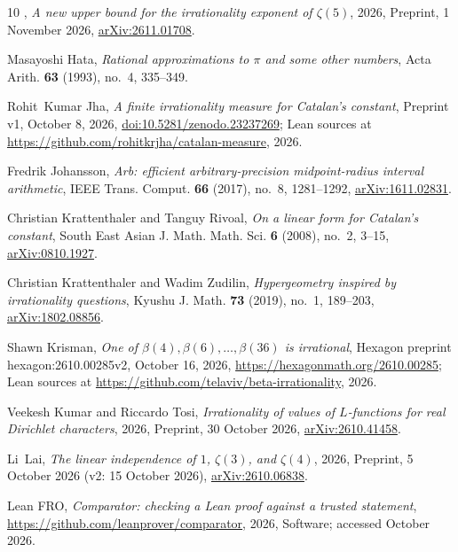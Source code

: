 \documentclass[11pt]{amsart}
\theoremstyle{definition}
\theoremstyle{remark}
\numberwithin{equation}{section}
\begin{document}
\begin{thebibliography}{10}
\bysame, \emph{A new upper bound for the irrationality exponent of
  {$\zeta(5)$}}, 2026, Preprint, 1 November 2026,
  \href{https://arxiv.org/abs/2611.01708}{arXiv:2611.01708}.

Masayoshi Hata, \emph{Rational approximations to {$\pi$} and some other
  numbers}, Acta Arith. \textbf{63} (1993), no.~4, 335--349.

Rohit~Kumar Jha, \emph{A finite irrationality measure for {C}atalan's
  constant}, Preprint v1, October 8, 2026,
  \href{https://doi.org/10.5281/zenodo.23237269}{doi:10.5281/zenodo.23237269};
  Lean sources at \url{https://github.com/rohitkrjha/catalan-measure}, 2026.

Fredrik Johansson, \emph{Arb: efficient arbitrary-precision midpoint-radius
  interval arithmetic}, IEEE Trans. Comput. \textbf{66} (2017), no.~8,
  1281--1292, \href{https://arxiv.org/abs/1611.02831}{arXiv:1611.02831}.

Christian Krattenthaler and Tanguy Rivoal, \emph{On a linear form for
  {C}atalan's constant}, South East Asian J. Math. Math. Sci. \textbf{6}
  (2008), no.~2, 3--15,
  \href{https://arxiv.org/abs/0810.1927}{arXiv:0810.1927}.

Christian Krattenthaler and Wadim Zudilin, \emph{Hypergeometry inspired by
  irrationality questions}, Kyushu J. Math. \textbf{73} (2019), no.~1,
  189--203, \href{https://arxiv.org/abs/1802.08856}{arXiv:1802.08856}.

Shawn Krisman, \emph{One of {$\beta(4),\beta(6),\ldots,\beta(36)$} is
  irrational}, Hexagon preprint hexagon:2610.00285v2, October 16, 2026,
  \url{https://hexagonmath.org/2610.00285}; Lean sources at
  \url{https://github.com/telaviv/beta-irrationality}, 2026.

Veekesh Kumar and Riccardo Tosi, \emph{Irrationality of values of
  {$L$}-functions for real {D}irichlet characters}, 2026, Preprint, 30 October
  2026, \href{https://arxiv.org/abs/2610.41458}{arXiv:2610.41458}.

Li~Lai, \emph{The linear independence of {$1$}, {$\zeta(3)$}, and
  {$\zeta(4)$}}, 2026, Preprint, 5 October 2026 (v2: 15 October 2026),
  \href{https://arxiv.org/abs/2610.06838}{arXiv:2610.06838}.

{Lean FRO}, \emph{Comparator: checking a {L}ean proof against a trusted
  statement}, \url{https://github.com/leanprover/comparator}, 2026, Software;
  accessed October 2026.


\end{thebibliography}
\end{document}
